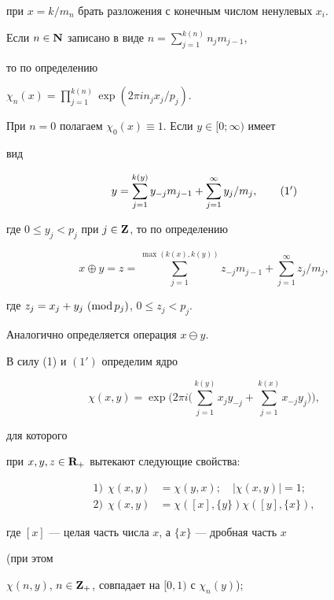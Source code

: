 при $x=k/m_n$ брать разложения с конечным числом ненулевых $x_i$. 


Если $n\in {\bold N}$ записано в виде $n=\sum\limits^{k(n)}_{j=1}n_jm_{j-1}$, 


то по определению 


$\chi_n(x)=\prod\limits^{k(n)}_{j=1}\exp(2{\pi}in_jx_j/p_j)$.


При $n=0$ полагаем $\chi_0(x)\equiv 1$. Если $y\in [0;\infty)$ имеет


вид


\begin{equation}


y=\sum^{k(y)}_{j=1}y_{-j}m_{j-1} + \sum^{\infty}_{j=1}y_j/m_j,\tag{1${}'$}


\end{equation}


где $0\leq y_j< p_j$ при $j\in {\bold Z}$, то по определению


$$


x\oplus y=z=\sum^{\max(k(x),k(y))}_{j=1}z_{-j}m_{j-1} + 


\sum^{\infty}_{j=1}z_j/m_j,


$$


где $z_j=x_j+y_j\ (\operatorname{mod} p_j)$, $0\leq z_j< p_j$. 


Аналогично определяется операция $x\ominus y$.





В силу (1) и $(1')$ определим ядро


$$


\chi(x,y)=\exp\bigg(2{\pi}i\bigg(\sum^{k(y)}_{j=1}x_jy_{-j} +


\sum^{k(x)}_{j=1}x_{-j}y_j\bigg)\bigg),


$$


для которого 


при $x,y,z\in {\bold R}_+$ вытекают следующие свойства:


\begin{align}


1)\ \ \chi(x,y)&=\chi(y,x);\quad |\chi(x,y)|=1;\\


2)\ \ \chi(x,y)&=\chi([x],\{y\})\chi([y],\{x\}),


\end{align}


где $[x]$ --- целая часть числа $x$, а $\{x\}$ --- дробная часть $x$


(при этом


$\chi(n,y)$, $n\in {\bold Z}_+$, совпадает на $[0,1)$ с $\chi_n(y)$);


